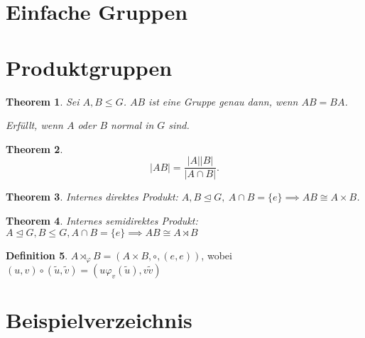 \documentclass[prb,12pt]{revtex4-2}
\newtheorem{Theorem}{Theorem}
\theoremstyle{definition}
\theoremstyle{definition}
\newtheorem{Definition}[Theorem]{Definition}
\begin{document}
	\section{Einfache Gruppen}
	\section{Produktgruppen}
	\begin{Theorem}
		Sei  $A,B\le G$. $AB$ ist eine Gruppe genau dann, wenn $AB=BA$.

		Erfüllt, wenn $A$ oder $B$ normal in $G$ sind.
	\end{Theorem}
	\begin{Theorem}
		\[
		|AB|=\frac{|A| |B|}{|A\cap B|}
		.\] 
	\end{Theorem}
	\begin{Theorem}
		Internes direktes Produkt: $A,B\trianglelefteq G,~A\cap B=\{e\}\implies AB\cong A\times B $.
	\end{Theorem}
	\begin{Theorem}
		Internes semidirektes Produkt: $A\trianglelefteq G, B\le G,A\cap B=\{e\} \implies AB\cong A\rtimes B$
	\end{Theorem}
	\begin{Definition}
		$A\rtimes_{\varphi} B=(A\times B, \circ, (e,e))$, wobei $(u,v)\circ (\tilde{u},\tilde{v})=(u\varphi_{v}(\tilde{u}), v\tilde{v})$
	\end{Definition}
	\section{Beispielverzeichnis}
	
\end{document}
